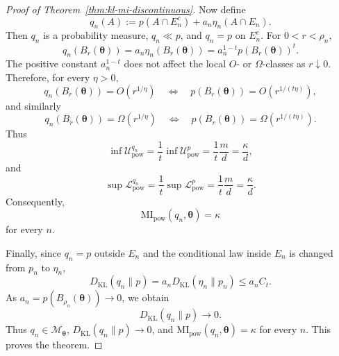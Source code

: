 \documentclass[11pt,a4paper]{article}
\newcommand{\MI}{\mathrm{MI}}
\newcommand{\pa}{\boldsymbol\theta}
\theoremstyle{compactplain}
\theoremstyle{compactdefinition}
\numberwithin{equation}{section}
\begin{document}
\begin{proof}[Proof of Theorem~\ref{thm:kl-mi-discontinuous}]
Now define
\[
 q_n(A):=p(A\cap E_n^c)+a_n\eta_n(A\cap E_n).
\]
Then \(q_n\) is a probability measure, \(q_n\ll p\), and \(q_n=p\) on
\(E_n^c\). For \(0<r<\rho_n\),
\[
 q_n(B_r(\pa))
 =a_n\eta_n(B_r(\pa))
 =a_n^{1-t}p(B_r(\pa))^t .
\]
The positive constant \(a_n^{1-t}\) does not affect the local \(O\)- or
\(\Omega\)-classes as \(r\downarrow0\). Therefore, for every \(\eta>0\),
\[
 q_n(B_r(\pa))=O(r^{1/\eta})
 \quad\Longleftrightarrow\quad
 p(B_r(\pa))=O(r^{1/(t\eta)}),
\]
and similarly
\[
 q_n(B_r(\pa))=\Omega(r^{1/\eta})
 \quad\Longleftrightarrow\quad
 p(B_r(\pa))=\Omega(r^{1/(t\eta)}).
\]
Thus
\[
 \inf\mathcal U_{\mathrm{pow}}^{q_n}
 =\frac1t\inf\mathcal U_{\mathrm{pow}}^p
 =\frac1t\frac md
 =\frac \kappa d,
\]
and
\[
 \sup\mathcal L_{\mathrm{pow}}^{q_n}
 =\frac1t\sup\mathcal L_{\mathrm{pow}}^p
 =\frac1t\frac md
 =\frac \kappa d.
\]
Consequently,
\[
 \MI_{\mathrm{pow}}(q_n,\pa)=\kappa
\]
for every \(n\).

Finally, since \(q_n=p\) outside \(E_n\) and the conditional law inside \(E_n\)
is changed from \(p_n\) to \(\eta_n\),
\[
 D_{\mathrm{KL}}(q_n\|p)
 =a_nD_{\mathrm{KL}}(\eta_n\|p_n)
 \le a_nC_t.
\]
As \(a_n=p(B_{\rho_n}(\pa))\to0\), we obtain
\[
 D_{\mathrm{KL}}(q_n\|p)\to0 .
\]
Thus \(q_n\in\mathcal M_{\pa}\), \(D_{\mathrm{KL}}(q_n\|p)\to0\), and
\(\MI_{\mathrm{pow}}(q_n,\pa)=\kappa\) for every \(n\). This proves the theorem.
\end{proof}
\end{document}

